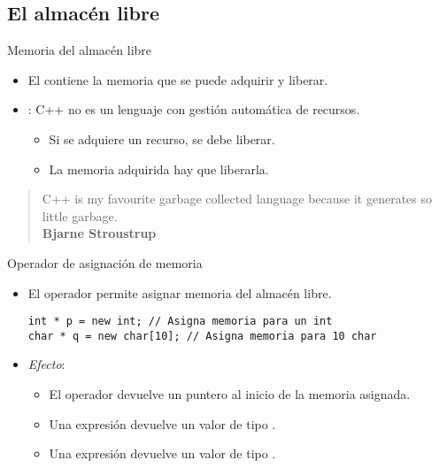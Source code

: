 \subsection{El almacén libre}

\begin{frame}[t]{Memoria del almacén libre}
\begin{itemize}
  \item El  contiene la memoria que 
        se puede adquirir y liberar.

  \vfill
  \item {}: C++ no es un lenguaje con gestión
        automática de recursos.
    \begin{itemize}
      \item Si se adquiere un recurso, se debe liberar.
      \item La memoria adquirida hay que liberarla.
    \end{itemize}
\end{itemize}
\vfill
\begin{quote}
C++ is my favourite garbage collected language
because it generates so little garbage.
\\
\textbf{Bjarne Stroustrup}
\end{quote}
\end{frame}

\begin{frame}[t,fragile]{Operador de asignación de memoria}
\begin{itemize}
  \item El operador  permite asignar memoria del almacén libre.
\begin{lstlisting}
int * p = new int; // Asigna memoria para un int
char * q = new char[10]; // Asigna memoria para 10 char
\end{lstlisting}

  \vfill
  \item \emph{Efecto}:
    \begin{itemize}
      \item El operador  devuelve un puntero al inicio de la memoria asignada.
      \item Una expresión   devuelve un valor de tipo .
      \item Una expresión   devuelve un valor de tipo .
    \end{itemize}
\end{itemize}
\end{frame}


